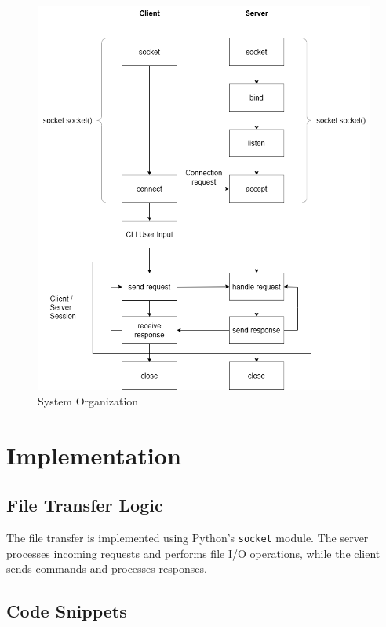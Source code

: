 \documentclass[a4paper,12pt]{article}
\begin{document}
\begin{figure}[h]
    \centering
    \includegraphics[width=\textwidth]{system_organization.png} %
    \caption{System Organization}
    \label{fig:system}
\end{figure}

\section*{Implementation}
\subsection*{File Transfer Logic}
The file transfer is implemented using Python's \texttt{socket} module. The server processes incoming requests and performs file I/O operations, while the client sends commands and processes responses.

\subsection*{Code Snippets}
\end{document}
